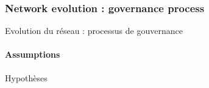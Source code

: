 


\subsubsection{Network evolution : governance process}{Evolution du réseau : processus de gouvernance}






\paragraph{Assumptions}{Hypothèses}

